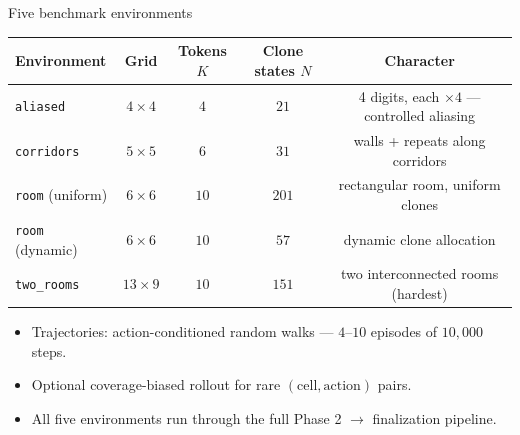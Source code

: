 \documentclass[aspectratio=169,10pt]{beamer}
\begin{document}
\begin{frame}{Five benchmark environments}
  \centering
  \small
  \begin{tabular}{@{}lcccc@{}}
    \toprule
    \textbf{Environment} & \textbf{Grid} & \textbf{Tokens $K$} & \textbf{Clone states $N$} & \textbf{Character}\\
    \midrule
    \texttt{aliased}            & $4\times 4$   & $4$  & $21$  & 4 digits, each $\times 4$ --- controlled aliasing\\
    \texttt{corridors}          & $5\times 5$   & $6$  & $31$  & walls + repeats along corridors\\
    \texttt{room} (uniform)     & $6\times 6$   & $10$ & $201$ & rectangular room, uniform clones\\
    \texttt{room} (dynamic)     & $6\times 6$   & $10$ & $57$  & dynamic clone allocation\\
    \texttt{two\_rooms}         & $13\times 9$  & $10$ & $151$ & two interconnected rooms (hardest)\\
    \bottomrule
  \end{tabular}

  \vspace{0.8em}
  \begin{itemize}
    \item Trajectories: action-conditioned random walks --- $4$--$10$ episodes of $10{,}000$ steps.
    \item Optional coverage-biased rollout for rare $(\text{cell}, \text{action})$ pairs.
    \item All five environments run through the full Phase 2 $\to$ finalization pipeline.
  \end{itemize}
\end{frame}
\end{document}
